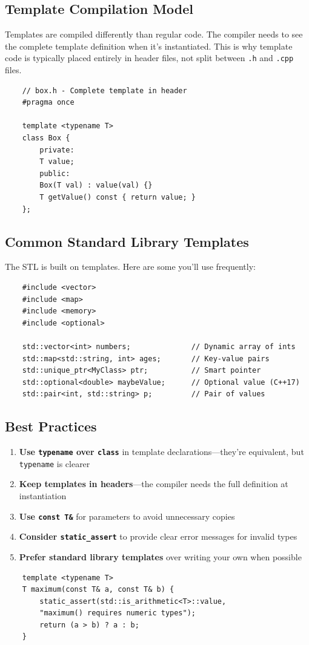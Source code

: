 \subsection{Template Compilation Model}

\begin{remark}
	Templates are compiled differently than regular code. The compiler needs to see the complete template definition when it's instantiated. This is why template code is typically placed entirely in header files, not split between \texttt{.h} and \texttt{.cpp} files.
\end{remark}

\begin{lstlisting}
	// box.h - Complete template in header
	#pragma once
	
	template <typename T>
	class Box {
		private:
		T value;
		public:
		Box(T val) : value(val) {}
		T getValue() const { return value; }
	};
\end{lstlisting}

\subsection{Common Standard Library Templates}

The STL is built on templates. Here are some you'll use frequently:

\begin{lstlisting}
	#include <vector>
	#include <map>
	#include <memory>
	#include <optional>
	
	std::vector<int> numbers;              // Dynamic array of ints
	std::map<std::string, int> ages;       // Key-value pairs
	std::unique_ptr<MyClass> ptr;          // Smart pointer
	std::optional<double> maybeValue;      // Optional value (C++17)
	std::pair<int, std::string> p;         // Pair of values
\end{lstlisting}

\subsection{Best Practices}

\begin{enumerate}
	\item \textbf{Use \texttt{typename} over \texttt{class}} in template declarations—they're equivalent, but \texttt{typename} is clearer
	\item \textbf{Keep templates in headers}—the compiler needs the full definition at instantiation
	\item \textbf{Use \texttt{const T\&}} for parameters to avoid unnecessary copies
	\item \textbf{Consider \texttt{static\_assert}} to provide clear error messages for invalid types
	\item \textbf{Prefer standard library templates} over writing your own when possible
\end{enumerate}

\begin{lstlisting}
	template <typename T>
	T maximum(const T& a, const T& b) {
		static_assert(std::is_arithmetic<T>::value, 
		"maximum() requires numeric types");
		return (a > b) ? a : b;
	}
\end{lstlisting}